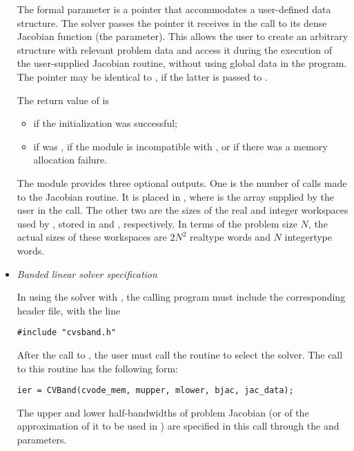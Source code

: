 \begin{itemize}
  The
   formal parameter  is a pointer that
  accommodates a user-defined data structure. The {\cvdense} solver
  passes the pointer it receives in the  call to its dense
  Jacobian function (the  parameter). This allows the user to
  create an arbitrary structure with relevant problem data and access it
  during the execution of the user-supplied Jacobian routine, without
  using global data in the program.  The pointer  may be
  identical to , if the latter is passed to
  .
  
  The return value  of  is
  \begin{itemize}
  \item {}
    if the {\cvdense} initialization was successful;
  \item {}
    if  was , if the {\nvector} module is incompatible 
    with {\cvdense}, or if there was a memory allocation failure.
  \end{itemize}
  
  The {\cvdense} module provides three optional outputs.
  One is the number of calls made to the Jacobian routine. It is placed
  in \id{iopt[}\id{]}, where  is the array supplied by the
  user in the  call.  The other two are the sizes of the
  real and integer workspaces used by {\cvdense}, stored in
  \id{iopt[}\id{]} and \id{iopt[}\id{]},
  respectively.
  In  
  terms of the problem size $N$, the actual sizes of these workspaces are 
  $2N^2$ realtype words and $N$ integertype words.
%
%
\item {\em Banded linear solver specification}
  
  In using the {\cvband} solver with {\cvodes}, the calling program must
  include the corresponding header file, with the line
\begin{verbatim}
#include "cvsband.h"
\end{verbatim}
  \par After the call to , the user must call the routine 
  to select the {\cvband} solver. The call to this routine has the following form:
\begin{verbatim}
ier = CVBand(cvode_mem, mupper, mlower, bjac, jac_data);
\end{verbatim}
  The upper and lower half-bandwidths of problem Jacobian (or of the
  approximation of it to be used in {\cvodes}) are specified in this call
  through the  and  parameters.
  

\end{itemize}
